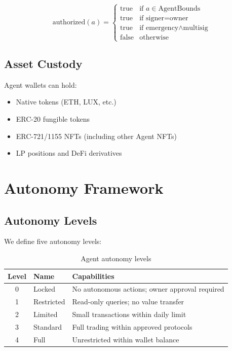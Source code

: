 \documentclass[11pt,letterpaper]{article}
\begin{document}
\begin{equation}
\text{authorized}(a) = \begin{cases}
\text{true} & \text{if } a \in \text{AgentBounds} \\
\text{true} & \text{if } \text{signer} = \text{owner} \\
\text{true} & \text{if } \text{emergency} \land \text{multisig} \\
\text{false} & \text{otherwise}
\end{cases}
\end{equation}

\subsection{Asset Custody}

Agent wallets can hold:
\begin{itemize}
    \item Native tokens (ETH, LUX, etc.)
    \item ERC-20 fungible tokens
    \item ERC-721/1155 NFTs (including other Agent NFTs)
    \item LP positions and DeFi derivatives
\end{itemize}

\section{Autonomy Framework}
\label{sec:autonomy}

\subsection{Autonomy Levels}

We define five autonomy levels:

\begin{table}[h]
\centering
\caption{Agent autonomy levels}
\label{tab:autonomy}
\begin{tabular}{clp{6cm}}
\toprule
\textbf{Level} & \textbf{Name} & \textbf{Capabilities} \\
\midrule
0 & Locked & No autonomous actions; owner approval required \\
1 & Restricted & Read-only queries; no value transfer \\
2 & Limited & Small transactions within daily limit \\
3 & Standard & Full trading within approved protocols \\
4 & Full & Unrestricted within wallet balance \\
\bottomrule
\end{tabular}
\end{table}
\end{document}
